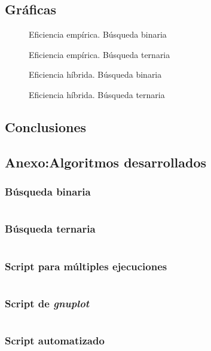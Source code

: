 \documentclass[12pt,spanish]{article}
\begin{document}
\subsection{Gráficas}

\begin{figure}[H]
\caption{Eficiencia empírica. Búsqueda binaria}
\end{figure}

\begin{figure}[H]
\caption{Eficiencia empírica. Búsqueda ternaria}
\end{figure}

\begin{figure}[H]
\caption{Eficiencia híbrida. Búsqueda binaria}
\end{figure}

\begin{figure}[H]
\caption{Eficiencia híbrida. Búsqueda ternaria}
\end{figure}

\subsection{Conclusiones}

\newpage
\subsection{Anexo:Algoritmos desarrollados}

\subsubsection{Búsqueda binaria}

\inputminted[linenos, fontsize=\footnotesize]{c++}{busqueda_binaria.cpp}

\newpage
\subsubsection{Búsqueda ternaria}

\inputminted[linenos, fontsize=\footnotesize]{c++}{busqueda_ternaria.cpp}


\subsubsection{Script para múltiples ejecuciones}
\label{script}

\inputminted[linenos, fontsize=\footnotesize]{bash}{individual.sh}

\subsubsection{Script de \emph{gnuplot}}

\inputminted[linenos, fontsize=\footnotesize]{bash}{gnuplot.sh}

\subsubsection{Script automatizado}

\inputminted[linenos, fontsize=\footnotesize]{bash}{all.sh}
\end{document}
